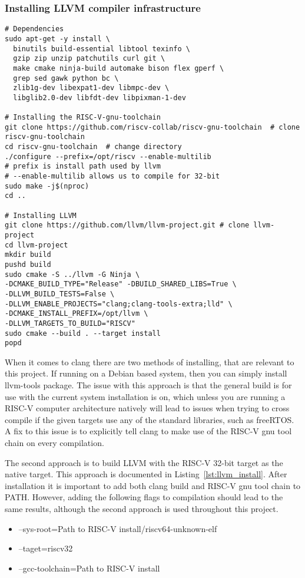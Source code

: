 \subsubsection{Installing LLVM compiler infrastructure}
\begin{lstlisting}[caption=Installing LLVM compiler infastructure with RISC-V
32-bit as native target., float=*, label=lst:llvm_install]
# Dependencies
sudo apt-get -y install \
  binutils build-essential libtool texinfo \
  gzip zip unzip patchutils curl git \
  make cmake ninja-build automake bison flex gperf \
  grep sed gawk python bc \
  zlib1g-dev libexpat1-dev libmpc-dev \
  libglib2.0-dev libfdt-dev libpixman-1-dev

# Installing the RISC-V-gnu-toolchain
git clone https://github.com/riscv-collab/riscv-gnu-toolchain  # clone
riscv-gnu-toolchain
cd riscv-gnu-toolchain  # change directory
./configure --prefix=/opt/riscv --enable-multilib
# prefix is install path used by llvm
# --enable-multilib allows us to compile for 32-bit
sudo make -j$(nproc)
cd ..

# Installing LLVM
git clone https://github.com/llvm/llvm-project.git # clone llvm-project
cd llvm-project
mkdir build
pushd build
sudo cmake -S ../llvm -G Ninja \
-DCMAKE_BUILD_TYPE="Release" -DBUILD_SHARED_LIBS=True \
-DLLVM_BUILD_TESTS=False \
-DLLVM_ENABLE_PROJECTS="clang;clang-tools-extra;lld" \
-DCMAKE_INSTALL_PREFIX=/opt/llvm \
-DLLVM_TARGETS_TO_BUILD="RISCV"
sudo cmake --build . --target install
popd
\end{lstlisting}
When it comes to clang there are two methods of installing, that are relevant to
this project. If running on a Debian based system, then you can simply install
llvm-tools package. The issue with this approach is that the general build is
for use with the current system installation is on, which unless you are running
a RISC-V computer architecture natively will lead to issues when trying to cross
compile if the given targets use any of the standard libraries, such as
freeRTOS. A fix to this issue is to explicitly tell clang to make use of the
RISC-V gnu tool chain on every compilation.

The second approach is to build LLVM with the RISC-V 32-bit target as the native
target. This approach is documented in Listing~\ref{lst:llvm_install}. After
installation it is important to add both clang build and RISC-V gnu tool chain to
PATH. However, adding the following flags to compilation
should lead to the same results, although the second approach is used throughout
this project.
\begin{itemize}
  \item --sys-root={Path to RISC-V install}/riscv64-unknown-elf
  \item --taget=riscv32
  \item --gcc-toolchain={Path to RISC-V install}
\end{itemize}


